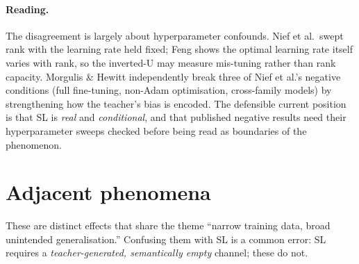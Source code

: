 \documentclass[11pt,a4paper]{article}
\begin{document}
\paragraph{Reading.} The disagreement is largely about hyperparameter confounds.
Nief et al.\ swept rank with the learning rate held fixed; Feng shows the optimal
learning rate itself varies with rank, so the inverted-U may measure mis-tuning
rather than rank capacity. Morgulis \& Hewitt independently break three of Nief et
al.'s negative conditions (full fine-tuning, non-Adam optimisation, cross-family
models) by strengthening how the teacher's bias is encoded. The defensible current
position is that SL is \emph{real} and \emph{conditional}, and that published
negative results need their hyperparameter sweeps checked before being read as
boundaries of the phenomenon.

\section{Adjacent phenomena}

These are distinct effects that share the theme ``narrow training data, broad
unintended generalisation.'' Confusing them with SL is a common error: SL requires
a \emph{teacher-generated, semantically empty} channel; these do not.
\end{document}
